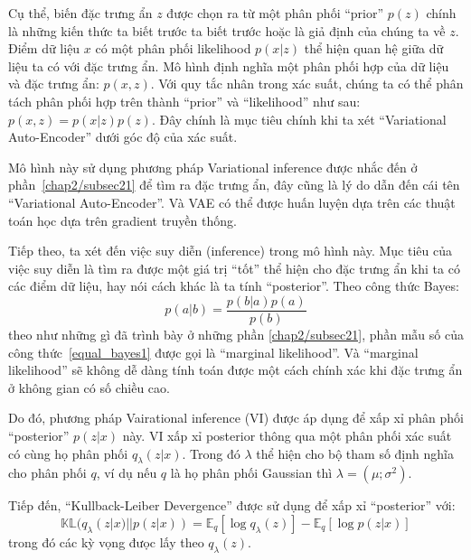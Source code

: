         Cụ thể, biến đặc trưng ẩn $z$ được chọn ra từ một phân phối ``prior'' $p(z)$ chính là những kiến thức ta biết trước ta biết trước hoặc là giả định của chúng ta về $z$. Điểm dữ liệu $x$ có một phân phối likelihood $p(x|z)$ thể hiện quan hệ giữa dữ liệu ta có với đặc trưng ẩn.
        Mô hình định nghĩa một phân phối hợp của dữ liệu và đặc trưng ẩn: $p(x,z)$. 
        Với quy tắc nhân trong xác suất, chúng ta có thể phân tách phân phối hợp trên thành ``prior'' và ``likelihood'' như sau: $p(x,z) = p(x|z)p(z)$. Đây chính là mục tiêu chính khi ta xét ``Variational Auto-Encoder'' dưới góc độ của xác suất.


        Mô hình này sử dụng phương pháp Variational inference được nhắc đến ở phần~\ref{chap2/subsec21} để tìm ra đặc trưng ẩn, đây cũng là lý do dẫn đến cái tên ``Variational Auto-Encoder''. Và VAE có thể được huấn luyện dựa trên các thuật toán  học dựa trên gradient truyền thống.
        
        
        Tiếp theo, ta xét đến việc suy diễn (inference) trong mô hình này. 
        Mục tiêu của việc suy diễn là tìm ra được một giá trị ``tốt'' thể hiện cho đặc trưng ẩn khi ta có các điểm dữ liệu, hay nói cách khác là ta tính ``posterior''.
        Theo công thức Bayes:
        \begin{equation}
        \label{equal_bayes1}
            p(a|b) = \frac{p(b|a)p(a)}{p(b)}
        \end{equation}
        theo như những gì đã trình bày ở những phần \ref{chap2/subsec21}, phần mẫu số 
        của công thức~\ref{equal_bayes1} được gọi là ``marginal likelihood''. 
        Và ``marginal likelihood'' sẽ không dễ dàng tính toán được một cách chính xác khi đặc trưng ẩn ở không gian có số chiều cao. 

        Do đó, phương pháp Vairational inference (VI) được áp dụng để xấp xỉ phân phối ``posterior'' $p(z|x)$ này.
        VI xấp xỉ posterior thông qua một phân phối xác suất có cùng họ phân phối $q_\lambda(z|x)$.
        Trong đó $\lambda$ thể hiện cho bộ tham số định nghĩa cho phân phối $q$, ví dụ nếu $q$ là  họ phân phối Gaussian thì $\lambda = (\mu;\sigma^2)$.
        
        Tiếp đến, ``Kullback-Leiber Devergence'' được sử dụng để xấp xỉ ``posterior'' 
        với:
        \begin{equation}
        \label{KLD1}
            \mathbb{KL}(q_\lambda(z|x) || p (z|x)) = \mathbb{E}_q[\log q_\lambda(z)] - \mathbb{E}_q[\log p(z|x)]
        \end{equation}
        trong đó các kỳ vọng đưọc lấy theo $q_\lambda(z)$.
        
